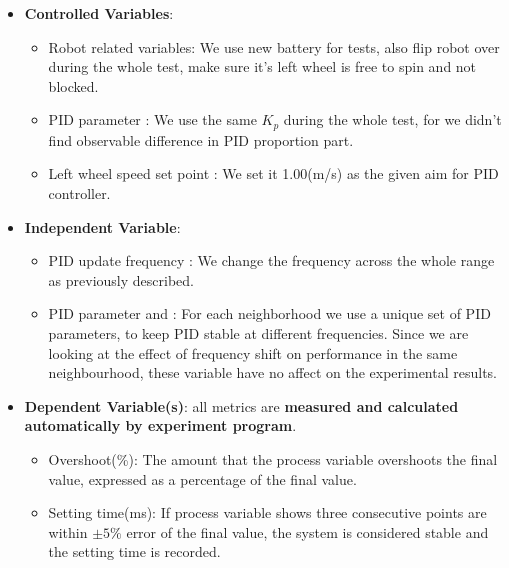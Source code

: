 \documentclass[conference]{IEEEtran}
\begin{document}
\begin{itemize}
    \item \textbf{Controlled Variables}: 
        \begin{itemize}
            \item Robot related variables: We use new battery for tests, also flip robot over during the whole test, make sure it's left wheel is free to spin and not blocked.
            \item PID parameter : We use the same $K_{p}$ during the whole test, for we didn't find observable difference in PID proportion part.
            \item Left wheel speed set point : We set it 1.00(m/s) as the given aim for PID controller.
        \end{itemize}
    \item \textbf{Independent Variable}: 
        \begin{itemize}
            \item PID update frequency : We change the frequency across the whole range as previously described. 
            \item PID parameter  and : For each neighborhood we use a unique set of PID parameters, to keep PID stable at different frequencies. Since we are looking at the effect of frequency shift on performance in the same neighbourhood, these variable have no affect on the experimental results. 
        \end{itemize}
    \item \textbf{Dependent Variable(s)}:  all metrics are \textbf{measured and calculated automatically by experiment program}.
        \begin{itemize}
            \item Overshoot(\%): The amount that the process variable overshoots the final value, expressed as a percentage of the final value.
            \item Setting time(ms): If process variable shows three consecutive points are within $\pm5\%$ error of the final value, the system is considered stable and the setting time is recorded.
        \end{itemize}
\end{itemize}
\end{document}
